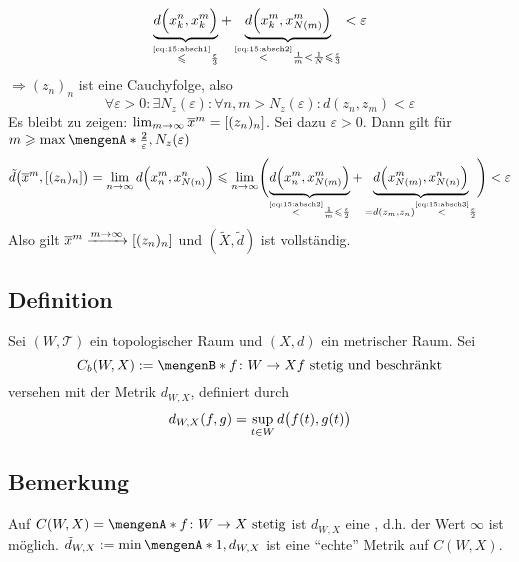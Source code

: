 \begin{description}
\begin{description}
\begin{align*}
		\underbrace{d\enbrace[\Big]{x^n_k, x^m_k}}_{\stackrel{\mbox{\tiny\eqref{eq:15:absch1}}}{\le} \frac{\varepsilon}{3}}   + 
		\underbrace{d\enbrace*{x^m_k, x^m_{N(m)}}}_{\stackrel{\mbox{\tiny\eqref{eq:15:absch2}}}{<} \frac{1}{m} < \frac{1}{N} \le \frac{\varepsilon}{3}} 
		< \varepsilon
	\end{align*}
	$\Rightarrow (z_n)_n$ ist eine Cauchyfolge, also 
	\begin{equation*}
		\forall \varepsilon>0 : \exists N_z(\varepsilon) : \forall n,m > N_z(\varepsilon)  : d(z_n,z_m) < \varepsilon  \label{eq:15:absch3} \tag{\#}
	\end{equation*}
	Es bleibt zu zeigen: $\lim_{m \to \infty} \overline{x}^m = \benbrace*{(z_n)_n}$. Sei dazu $\varepsilon>0$. Dann gilt für 
	$m \ge \max \set{\frac{2}{\varepsilon}, N_z(\varepsilon)}$
	\begin{align*}
		\tilde{d} \enbrace[\big]{\overline{x}^m, \benbrace*{(z_n)_n}} = \lim_{ n \to \infty} d \enbrace*{x^m_n, x^n_{N(n)}}\le \lim_{ n \to \infty} 
		\enbrace[\Bigg]{ \underbrace{d\enbrace*{x_n^m, x^m_{N(m)}}}_{\stackrel{\mbox{\tiny\eqref{eq:15:absch2}}}{<} \frac{1}{m} \le \frac{\varepsilon}{2}  } +
		\underbrace{d\enbrace*{x^m_{N(m)}, x^n_{N(n)}}}_{=d(z_m,z_n) \stackrel{\mbox{\tiny\eqref{eq:15:absch3}}}{<} \frac{\varepsilon}{2} } } < \varepsilon
	\end{align*}
	Also gilt $\overline{x}^m \xrightarrow{m \to \infty} \benbrace*{(z_n)_n}$ und $(\tilde{X},\tilde{d})$ ist vollständig. \bewende
	\end{description}
\end{description}

\subsection[Definition: Raum der beschränkten, stetigen Abbildungen]{Definition} %
\label{sub:16}
Sei $(W,\mathcal{T})$ ein topologischer Raum und $(X,d)$ ein metrischer Raum. Sei 
\[
	C_b(W,X) := \set[f \colon W \to X]{f \text{ stetig und beschränkt}} 
\]
versehen mit der Metrik $d_{W,X}$, definiert durch
\[
	d_{W,X}(f,g) = \sup_{t \in W} d \enbrace[\big]{f(t), g(t)} 
\]

\subsection[Bemerkung: $d_{W,X}$ als Metrik auf $C(W,X)$]{Bemerkung} %
\label{sub:17}
Auf $C(W,X) = \set{f \colon W \to X \text{ stetig}} $ ist $d_{W,X}$ eine , d.h. der Wert $\infty$ ist möglich.
$\tilde{d}_{W,X} := \min \set{1, d_{W,X}} $ ist eine \enquote{echte} Metrik auf $C(W,X)$.

